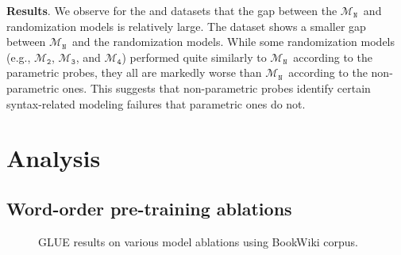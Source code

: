 \documentclass[letterpaper, 12pt]{report}
\newcommand{\xhdr}[1]{{\noindent\bfseries #1}.}
\newcommand{\OR}{$\mathcal{M}_{\texttt{N}}$}
\newcommand{\RII}{$\mathcal{M}_{\texttt{2}}$}
\newcommand{\RIII}{$\mathcal{M}_{\texttt{3}}$}
\newcommand{\RIV}{$\mathcal{M}_{\texttt{4}}$}
\begin{document}
\xhdr{Results}
We observe for the \citet{linzen-etal-2016-assessing} and \citet{marvin-linzen-2018-targeted} datasets that the gap between the \OR\ and randomization models is relatively large.
The \citet{gulordava-etal-2018-colorless} dataset shows a smaller gap between \OR\ and the randomization models. While some randomization models (e.g., \RII, \RIII, and \RIV) performed quite similarly to \OR\ according to the parametric probes, they all are markedly worse than \OR\ according to the non-parametric ones. This suggests that non-parametric probes identify certain syntax-related modeling failures
that parametric ones do not.



\section{Analysis}
\label{sec:mlm_analysis}


\subsection{Word-order pre-training ablations}
\label{sec:mlm_ablations}



\begin{figure}[t]
    \centering
    \caption{GLUE results on various model ablations using BookWiki corpus.}
    \label{fig:mlm_all_glue_plot}
\end{figure}
\end{document}
